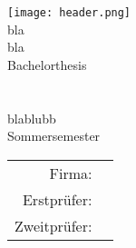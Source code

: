 \begin{titlepage}
	\begin{center}
		\texttt{[image: header.png]}\\
		\vspace{1cm} \Large bla\\
		\vspace{0.5cm} \Large bla\\
		\vspace{1.25cm} \Large Bachelorthesis\\
		\vspace{0.5cm} \Huge \thetitle \\
		\vspace{1.5cm} \Large \theauthor \\
		\vspace{0.2cm} \small blablubb\\
		\vspace{0.5cm} \normalsize Sommersemester \the\year\\
		\vfill
		
		\begin{tabular}{rl}
			Firma: & \\[0.3cm]
			Erstprüfer: & \\ [0.1cm]
			Zweitprüfer: & \\
		\end{tabular}
	\end{center}
\end{titlepage}